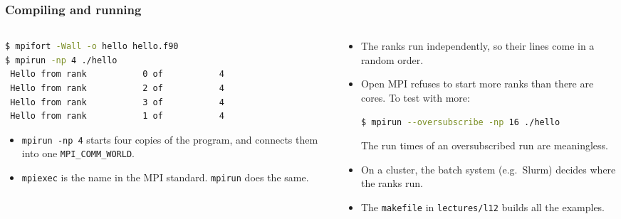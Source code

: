 \begin{frame}[fragile]
  \frametitle{Compiling and running}
  \begin{columns}[T]
    \begin{column}{0.5\textwidth}
\begin{lstlisting}[language=bash]
$ mpifort -Wall -o hello hello.f90
$ mpirun -np 4 ./hello
 Hello from rank           0 of           4
 Hello from rank           2 of           4
 Hello from rank           3 of           4
 Hello from rank           1 of           4
\end{lstlisting}

      \begin{itemize}
        \item \texttt{mpirun -np 4} starts four copies of the program, and connects them into one \texttt{MPI\_COMM\_WORLD}.
        \item \texttt{mpiexec} is the name in the MPI standard. \texttt{mpirun} does the same.
      \end{itemize}
    \end{column}

    \begin{column}{0.5\textwidth}
      \begin{itemize}
        \item The ranks run independently, so their lines come in a random order.
        \item Open MPI refuses to start more ranks than there are cores. To test with more:
\begin{lstlisting}[language=bash]
$ mpirun --oversubscribe -np 16 ./hello
\end{lstlisting}
          The run times of an oversubscribed run are meaningless.
        \item On a cluster, the batch system (e.g.\ Slurm) decides where the ranks run.
        \item The \texttt{makefile} in \texttt{lectures/l12} builds all the examples.
      \end{itemize}
    \end{column}
  \end{columns}
\end{frame}



